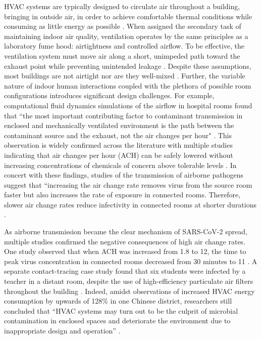 HVAC systems are typically designed to circulate air throughout a building, bringing in outside air, in order to achieve comfortable thermal conditions while consuming as little energy as possible \cite{memarzadeh_role_2012}. When assigned the secondary task of maintaining indoor air quality, ventilation operates by the same principles as a laboratory fume hood: airtightness and controlled airflow. To be effective, the ventilation system must move air along a short, unimpeded path toward the exhaust point while preventing unintended leakage \cite{ng_iaq_2015}. Despite these assumptions, most buildings are not airtight nor are they well-mixed \cite{emmerich_investigation_2005}. Further, the variable nature of indoor human interactions coupled with the plethora of possible room configurations introduces significant design challenges. For example, computational fluid dynamics simulations of the airflow in hospital rooms found that ``the most important contributing factor to contaminant transmission in enclosed and mechanically ventilated environment is the path between the contaminant source and the exhaust, not the air changes per hour" \cite{memarzadeh_role_2012}. This observation is widely confirmed across the literature with multiple studies indicating that air changes per hour (ACH) can be safely lowered without increasing concentrations of chemicals of concern above tolerable levels \cite{ng_IAQ_2015, lamping_air_nodate, li_evaluation_2014}. In concert with these findings, studies of the transmission of airborne pathogens suggest that “increasing the air change rate removes virus from the source room faster but also increases the rate of exposure in connected rooms. Therefore, slower air change rates reduce infectivity in connected rooms at shorter durations \cite{pease_investigation_2021}. 

As airborne transmission became the clear mechanism of SARS-CoV-2 spread, multiple studies confirmed the negative consequences of high air change rates. One study observed that when ACH was increased from 1.8 to 12, the time to peak virus concentration in connected rooms decreased from 30 minutes to 11 \cite{pease_investigation_2021}. A separate contact-tracing case study found that six students were infected by a teacher in a distant room, despite the use of high-efficiency particulate air filters throughout the building \cite{turakhia_ultrafast_2021}. Indeed, amidst observations of increased HVAC energy consumption by upwards of 128\% in one Chinese district, researchers still concluded that “HVAC systems may turn out to be the culprit of microbial contamination in enclosed spaces and deteriorate the environment due to inappropriate design and operation”  \cite{zheng_covid-19_2021}.

